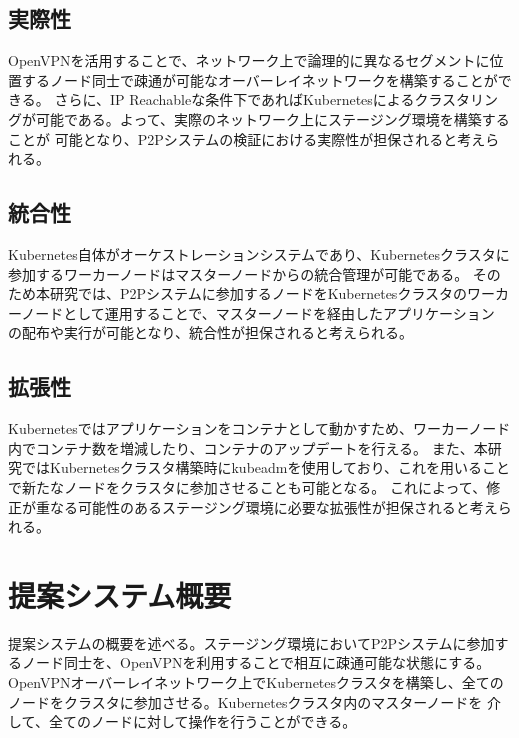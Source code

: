 \subsection{実際性}
OpenVPNを活用することで、ネットワーク上で論理的に異なるセグメントに位置するノード同士で疎通が可能なオーバーレイネットワークを構築することができる。
さらに、IP Reachableな条件下であればKubernetesによるクラスタリングが可能である。よって、実際のネットワーク上にステージング環境を構築することが
可能となり、P2Pシステムの検証における実際性が担保されると考えられる。

\subsection{統合性}
Kubernetes自体がオーケストレーションシステムであり、Kubernetesクラスタに参加するワーカーノードはマスターノードからの統合管理が可能である。
そのため本研究では、P2Pシステムに参加するノードをKubernetesクラスタのワーカーノードとして運用することで、マスターノードを経由したアプリケーション
の配布や実行が可能となり、統合性が担保されると考えられる。

\subsection{拡張性}
Kubernetesではアプリケーションをコンテナとして動かすため、ワーカーノード内でコンテナ数を増減したり、コンテナのアップデートを行える。
また、本研究ではKubernetesクラスタ構築時にkubeadmを使用しており、これを用いることで新たなノードをクラスタに参加させることも可能となる。
これによって、修正が重なる可能性のあるステージング環境に必要な拡張性が担保されると考えられる。

\section{提案システム概要}
提案システムの概要を述べる。ステージング環境においてP2Pシステムに参加するノード同士を、OpenVPNを利用することで相互に疎通可能な状態にする。
OpenVPNオーバーレイネットワーク上でKubernetesクラスタを構築し、全てのノードをクラスタに参加させる。Kubernetesクラスタ内のマスターノードを
介して、全てのノードに対して操作を行うことができる。


